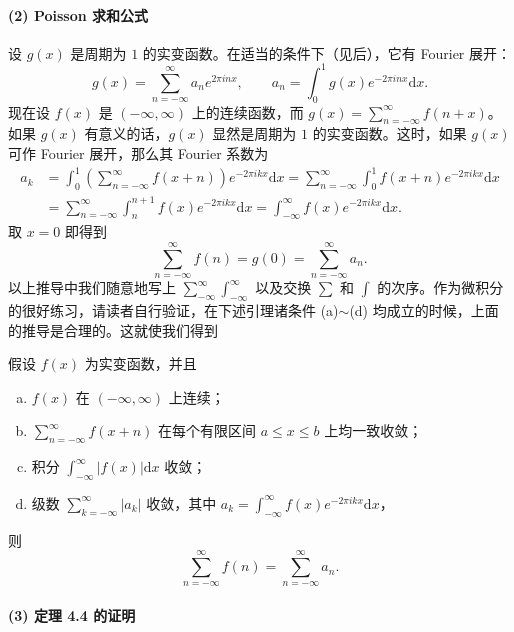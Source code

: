 \paragraph{(2) Poisson 求和公式}

\begin{sloppypar}
设 $g(x)$ 是周期为 $1$ 的实变函数。在适当的条件下（见后），它有 Fourier 展开：
\[
  g(x)=\sum_{n=-\infty}^{\infty}a_ne^{2\pi inx},\qquad a_n=\int_0^1g(x)e^{-2\pi inx}\mathrm{d}x.
\]
现在设 $f(x)$ 是 $(-\infty,\infty)$ 上的连续函数，而 $g(x)=\sum_{n=-\infty}^{\infty}f(n+x)$。如果 $g(x)$ 有意义的话，$g(x)$ 显然是周期为 $1$ 的实变函数。这时，如果 $g(x)$ 可作 Fourier 展开，那么其 Fourier 系数为
\begin{align*}
  a_k&=\int_0^1\left(\sum_{n=-\infty}^{\infty}f(x+n)\right)e^{-2\pi ikx}\mathrm{d}x
  =\sum_{n=-\infty}^{\infty}\int_0^1f(x+n)e^{-2\pi ikx}\mathrm{d}x\\
  &=\sum_{n=-\infty}^{\infty}\int_n^{n+1}f(x)e^{-2\pi ikx}\mathrm{d}x
  =\int_{-\infty}^{\infty}f(x)e^{-2\pi ikx}\mathrm{d}x.
\end{align*}
取 $x=0$ 即得到
\[
  \sum_{n=-\infty}^{\infty}f(n)=g(0)=\sum_{n=-\infty}^{\infty}a_n.
\]
以上推导中我们随意地写上 $\sum_{-\infty}^{\infty}\int_{-\infty}^{\infty}$ 以及交换 $\sum$ 和 $\int$ 的次序。作为微积分的很好练习，请读者自行验证，在下述引理诸条件 (a)$\sim$(d) 均成立的时候，上面的推导是合理的。这就使我们得到
\end{sloppypar}

\begin{lemma}\label{lem:ch4-4}
假设 $f(x)$ 为实变函数，并且
\begin{enumerate}[(a)]
  \item $f(x)$ 在 $(-\infty,\infty)$ 上连续；
  \item $\sum_{n=-\infty}^{\infty}f(x+n)$ 在每个有限区间 $a\leqslant x\leqslant b$ 上均一致收敛；
  \item 积分 $\int_{-\infty}^{\infty}|f(x)|\mathrm{d}x$ 收敛；
  \item 级数 $\sum_{k=-\infty}^{\infty}|a_k|$ 收敛，其中 $a_k=\int_{-\infty}^{\infty}f(x)e^{-2\pi ikx}\mathrm{d}x$，
\end{enumerate}
则
\[
  \sum_{n=-\infty}^{\infty}f(n)=\sum_{n=-\infty}^{\infty}a_n.
\]
\end{lemma}

\paragraph{(3) 定理 4.4 的证明}

